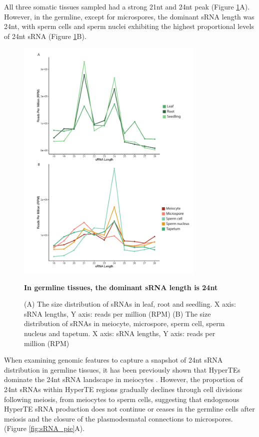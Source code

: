 All three somatic tissues sampled had a strong 21nt and 24nt peak (Figure \ref{fig:sRNA_sizes}A). However, in the germline, except for microspores, the dominant sRNA length was 24nt, with sperm cells and sperm nuclei exhibiting the highest proportional levels of 24nt sRNA (Figure \ref{fig:sRNA_sizes}B).

\begin{figure}[htbp!] 
\centering    
    \includegraphics[width=0.8\textwidth]{Chapter2/Figs/Figure6_sRNA_sizes.pdf}
\caption{\textbf{In germline tissues, the dominant sRNA length is 24nt}}
\label{fig:sRNA_sizes}
\captionsetup{font=small}
    \caption*{(A) The size distribution of sRNAs in leaf, root and seedling. X axis: sRNA lengths, Y axis: reads per million (RPM) (B) The size distribution of sRNAs in meiocyte, microspore, sperm cell, sperm nucleus and tapetum. X axis: sRNA lengths, Y axis: reads per million (RPM)}
\end{figure}

When examining genomic features to capture a snapshot of 24nt sRNA distribution in germline tissues, it has been previously shown that HyperTEs dominate the 24nt sRNA landscape in meiocytes \cite{RN187}. However, the proportion of 24nt sRNAs within HyperTE regions gradually declines through cell divisions following meiosis, from meiocytes to sperm cells, suggesting that endogenous HyperTE sRNA production does not continue or ceases in the germline cells after meiosis and the closure of the plasmodesmatal connections to microspores. (Figure \ref{fig:sRNA_pie}A). 

